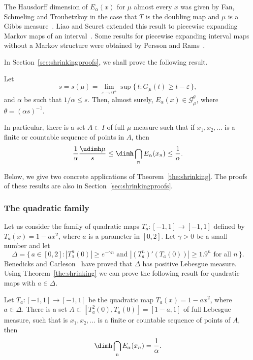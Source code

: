 The Hausdorff dimension of $E_\alpha (x)$ for $\mu$ almost every $x$ was given by Fan, Schmeling and Troubetzkoy in the case that $T$ is the doubling map and $\mu$ is a Gibbs measure~\cite{fanschmelingtroubetzkoy}. Liao and Seuret extended this result to piecewise expanding Markov maps of an interval~\cite{liaoseuret}. Some results for piecewise expanding interval maps without a Markov structure were obtained by Persson and Rams~\cite{perssonrams}.

In Section~\ref{sec:shrinkingproofs}, we shall prove the following result.

\begin{theo}\label{the:shrinking}
Let
\[
s = s (\mu) = \lim_{\varepsilon \to 0^+} \sup \{\, t : G_\mu (t)
\geq t - \varepsilon \,\},
\]
and $\alpha$ be such that $1/\alpha \leq s$. Then, almost surely, $E_\alpha (x) \in \mathscr{G}_\mu^\theta$, where $\theta = (\alpha s)^{-1}$.

In particular, there is a set $A \subset I$ of full $\mu$ measure such that if $x_1, x_2, \ldots$ is a finite or countable sequence of points in $A$, then
\[
\frac{1}{\alpha} \frac{\udimh \mu}{s} \leq \dimh \bigcap_n E_\alpha (x_n) \leq \frac{1}{\alpha}.
\]
\end{theo}

Below, we give two concrete applications of Theorem~\ref{the:shrinking}. The proofs of these results are also in Section~\ref{sec:shrinkingproofs}.

\subsubsection{The quadratic family} \label{sec:quadratic}

Let us consider the family of quadratic maps $T_a \colon [-1,1] \to [-1,1]$ defined by $T_a (x) = 1 - a x^2$, where $a$ is a parameter in $[0,2]$. Let $\gamma > 0$ be a small number and let
\[
\Delta = \{\, a \in [0, 2] : |T_a^n (0)| \geq e^{-\gamma n} \text{ and } |(T_a^n)' (T_a(0)) | \geq 1.9^n \text{ for all } n \,\}.
\]
Benedicks and Carleson~\cite{benedickscarleson} have proved that $\Delta$ has positive Lebesgue measure. Using Theorem~\ref{the:shrinking} we can prove the following result for quadratic maps with $a \in \Delta$.

\begin{coro}\label{cor:quadratic}
Let $T_a \colon [-1,1] \to [-1,1]$ be the quadratic map $T_a (x) = 1 - a x^2$, where $a \in \Delta$. There is a set $A \subset [T_a^2 (0), T_a (0)] = [1-a,1]$ of full Lebesgue measure, such that is $x_1, x_2, \ldots$ is a finite or countable sequence of points of\/ $A$, then
\[
\dimh \bigcap_n E_\alpha (x_n) = \frac{1}{\alpha}.
\]
\end{coro}


